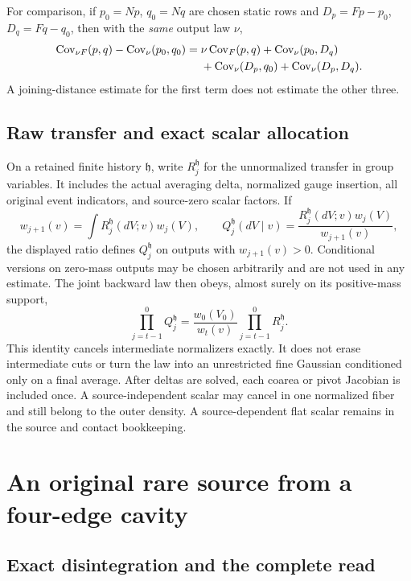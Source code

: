 For comparison, if $p_0=Np$, $q_0=Nq$ are chosen static rows and $D_p=Fp-p_0$, $D_q=Fq-q_0$, then with the \emph{same} output law $\nu$,
\begin{align}\label{eq:static-comparison}
 \operatorname{Cov}_{\nu F}(p,q)-\operatorname{Cov}_\nu(p_0,q_0)
 ={}&\nu\operatorname{Cov}_F(p,q)+\operatorname{Cov}_\nu(p_0,D_q)\\
 &+\operatorname{Cov}_\nu(D_p,q_0)+\operatorname{Cov}_\nu(D_p,D_q).\nonumber
\end{align}
A joining-distance estimate for the first term does not estimate the other three.

\subsection{Raw transfer and exact scalar allocation}

On a retained finite history $\mathfrak h$, write $R_j^{\mathfrak h}$ for the unnormalized transfer in group variables. It includes the actual averaging delta, normalized gauge insertion, all original event indicators, and source-zero scalar factors. If
\begin{equation}\label{eq:raw-transfer}
 w_{j+1}(v)=\int R_j^{\mathfrak h}(dV;v)w_j(V),\qquad
 Q_j^{\mathfrak h}(dV\mid v)=
       \frac{R_j^{\mathfrak h}(dV;v)w_j(V)}{w_{j+1}(v)},
\end{equation}
the displayed ratio defines $Q_j^{\mathfrak h}$ on outputs with $w_{j+1}(v)>0$. Conditional versions on zero-mass outputs may be chosen arbitrarily and are not used in any estimate. The joint backward law then obeys, almost surely on its positive-mass support,
\begin{equation}\label{eq:raw-telescope}
 \prod_{j=t-1}^{0}Q_j^{\mathfrak h}
 =\frac{w_0(V_0)}{w_t(v)}\prod_{j=t-1}^{0}R_j^{\mathfrak h}.
\end{equation}
This identity cancels intermediate normalizers exactly. It does not erase intermediate cuts or turn the law into an unrestricted fine Gaussian conditioned only on a final average. After deltas are solved, each coarea or pivot Jacobian is included once. A source-independent scalar may cancel in one normalized fiber and still belong to the outer density. A source-dependent flat scalar remains in the source and contact bookkeeping.

\section{An original rare source from a four-edge cavity}
\label{sec:cavity}

\subsection{Exact disintegration and the complete read}

